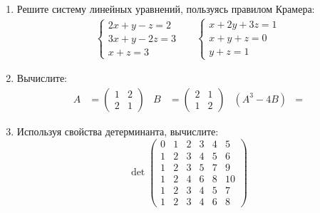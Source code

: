 {\begin{enumerate}
        \item Решите систему линейных уравнений, пользуясь правилом Крамера:
        \begin{align*}
            \begin{cases}
                2x + y - z = 2 \\
                3x + y -2z = 3 \\
                x + z = 3
            \end{cases}
            & & 
            \begin{cases}
                x + 2y + 3z = 1\\
                x + y + z = 0\\
                y + z = 1
            \end{cases}
        \end{align*}


        \item Вычислите:
        \begin{align*}
            A &= \begin{pmatrix}1 & 2 \\2 & 1 \end{pmatrix} &
            B &= \begin{pmatrix}2 & 1 \\1 & 2 \end{pmatrix} &
            (A^3 -4B) &=
        \end{align*}


        \item Используя свойства детерминанта, вычислите:
        \[
            \det 
            \begin{pmatrix}
            0 & 1 & 2 & 3 & 4 & 5 \\
            1 & 2 & 3 & 4 & 5 & 6 \\
            1 & 2 & 3 & 5 & 7 & 9 \\
            1 & 2 & 4 & 6 & 8 & 10 \\
            1 & 2 & 3 & 4 & 5 & 7 \\
            1 & 2 & 3 & 4 & 6 & 8
            \end{pmatrix}
        \]


    \end{enumerate}
}

